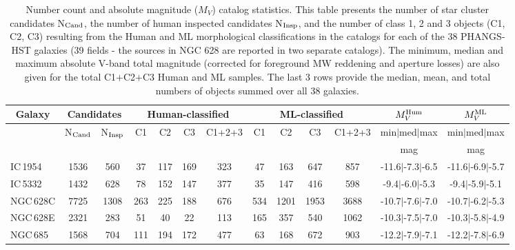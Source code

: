 \documentclass[linenumbers]{aastex63}
\begin{document}
\begin{table*}
\begin{center}
\caption{Number count and absolute magnitude ($M_V$) catalog statistics. This table presents the number of star cluster candidates N$_{\rm Cand}$, the number of human inspected candidates N$_{\rm Insp}$, and the number of class 1, 2 and 3 objects (C1, C2, C3) resulting from the Human and ML morphological classifications in the catalogs for each of the 38 PHANGS-HST galaxies (39 fields - the sources in NGC 628 are reported in two separate catalogs). The minimum, median and maximum absolute V-band total magnitude (corrected for foreground MW reddening and aperture losses) are also given for the total C1$+$C2$+$C3 Human and ML samples. The last 3 rows provide the median, mean, and total numbers of objects summed over all 38 galaxies.}
\label{tab:numbers}
\begin{tabular}{lcccccccccccc}
\hline\hline
\multicolumn{1}{c}{Galaxy} & \multicolumn{2}{c}{Candidates} & \multicolumn{4}{c}{Human-classified} & \multicolumn{4}{c}{ML-classified} & \multicolumn{1}{c}{$M_V^{\rm Hum}$} & \multicolumn{1}{c}{$M_V^{\rm ML}$} \\ 
\hline
\multicolumn{1}{c}{} & \multicolumn{1}{c}{N$_{\rm Cand}$} & \multicolumn{1}{c}{N$_{\rm Insp}$} & \multicolumn{1}{c}{C1} & \multicolumn{1}{c}{C2} & \multicolumn{1}{c}{C3} & \multicolumn{1}{c}{C1+2+3} & \multicolumn{1}{c}{C1} & \multicolumn{1}{c}{C2} & \multicolumn{1}{c}{C3} & \multicolumn{1}{c}{C1+2+3} & \multicolumn{1}{c}{min$\vert$med$\vert$max} & \multicolumn{1}{c}{min$\vert$med$\vert$max} \\ 
\hline
\multicolumn{1}{c}{} & \multicolumn{1}{c}{} & \multicolumn{1}{c}{} & \multicolumn{4}{c}{} & \multicolumn{4}{c}{} & \multicolumn{1}{c}{mag} & \multicolumn{1}{c}{mag} \\ 
\hline
IC\,1954 & 1536 & 560 & 37 & 117 & 169 & 323 & 47 & 163 & 647 & 857 & -11.6$\vert$-7.3$\vert$-6.5 & -11.6$\vert$-6.9$\vert$-5.7 \\ 
IC\,5332 & 1432 & 628 & 78 & 152 & 147 & 377 & 35 & 147 & 416 & 598 & -9.4$\vert$-6.0$\vert$-5.3 & -9.4$\vert$-5.9$\vert$-5.1 \\ 
NGC\,628C & 7725 & 1308 & 263 & 225 & 188 & 676 & 534 & 1201 & 1953 & 3688 & -10.7$\vert$-7.6$\vert$-7.0 & -10.7$\vert$-6.2$\vert$-5.3 \\ 
NGC\,628E & 2321 & 283 & 51 & 40 & 22 & 113 & 165 & 357 & 540 & 1062 & -10.3$\vert$-7.5$\vert$-7.0 & -10.3$\vert$-5.8$\vert$-4.9 \\ 
NGC\,685 & 1568 & 704 & 111 & 194 & 172 & 477 & 63 & 168 & 672 & 903 & -12.2$\vert$-7.9$\vert$-7.1 & -12.2$\vert$-7.8$\vert$-6.9 \\ 

\end{tabular}
\end{center}
\end{table*}
\end{document}
